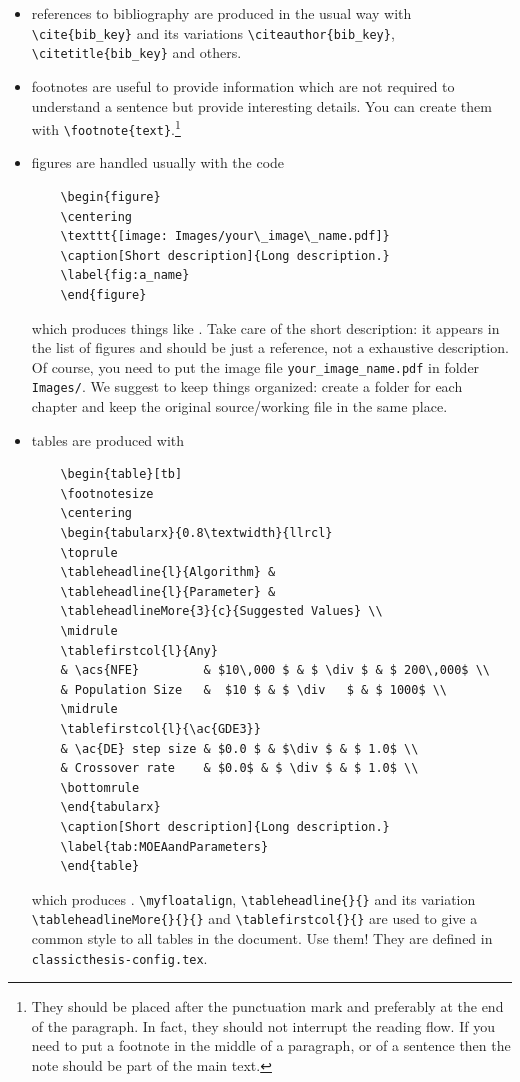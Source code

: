 \begin{itemize}
	\item references to bibliography are produced in the usual way with \verb!\cite{bib_key}! \cite{bringhurst:2002} and its variations \verb!\citeauthor{bib_key}!, \verb!\citetitle{bib_key}! and others.

	\item footnotes are useful to provide information which are not required to understand a sentence but provide interesting details. You can create them with \verb!\footnote{text}!.\footnote{They should be placed after the punctuation mark and preferably at the end of the paragraph. In fact, they should not interrupt the reading flow. If you need to put a footnote in the middle of a paragraph, or of a sentence then the note should be part of the main text.}

	\item figures are handled usually with the code
	\begin{verbatim}
	\begin{figure}
	\centering
	\texttt{[image: Images/your\_image\_name.pdf]} 
	\caption[Short description]{Long description.}
	\label{fig:a_name}
	\end{figure}
	\end{verbatim}
	which produces things like . 
	Take care of the short description: it appears in the list of figures and should be just a reference, not a exhaustive description.
	Of course, you need to put the image file \verb!your_image_name.pdf! in folder \verb!Images/!.
	We suggest to keep things organized: create a folder for each chapter and keep the original source/working file in the same place.

	\item tables are produced with
	\begin{verbatim}
	\begin{table}[tb]
	\footnotesize
	\centering
	\begin{tabularx}{0.8\textwidth}{llrcl}
	\toprule
	\tableheadline{l}{Algorithm} &
	\tableheadline{l}{Parameter} &
	\tableheadlineMore{3}{c}{Suggested Values} \\
	\midrule
	\tablefirstcol{l}{Any}
	& \acs{NFE} 		& $10\,000 $ & $ \div $ & $ 200\,000$ \\
	& Population Size 	&  $10 $ & $ \div 	$ & $ 1000$ \\
	\midrule
	\tablefirstcol{l}{\ac{GDE3}}
	& \ac{DE} step size & $0.0 $ & $\div $ & $ 1.0$ \\
	& Crossover rate 	& $0.0$ & $ \div $ & $ 1.0$ \\
	\bottomrule
	\end{tabularx}
	\caption[Short description]{Long description.}
	\label{tab:MOEAandParameters}
	\end{table}
	\end{verbatim}
	which produces .
	\verb!\myfloatalign!, \verb!\tableheadline{}{}! and its variation \verb!\tableheadlineMore{}{}{}! and \verb!\tablefirstcol{}{}! are used to give a common style to all tables in the document.
	Use them!
	They are defined in \verb!classicthesis-config.tex!.


\end{itemize}
